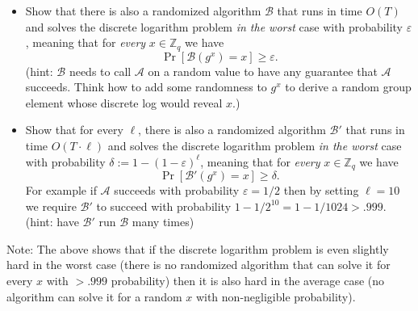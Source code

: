 \documentclass[11pt]{article}
\newcommand {\eps} {\varepsilon}
\newcommand {\A} {\mathcal{A}}
\newcommand{\B}{\mathcal{B}}
\newcommand {\ZZ} {\mathbb{Z}}
\begin{document}
\begin{itemize}
	\item Show that there is also a randomized algorithm $\B$ that runs in time $O(T)$ and solves the discrete logarithm problem  \emph{in the worst} case with probability $\eps$, meaning that for \emph{every} $x \in \ZZ_q$ we have
	$$ \Pr[\B(g^x) =x] \geq \eps.$$
   (hint: $\B$ needs to call $\A$ on a random value to have any guarantee that $\A$ succeeds. Think how to add some randomness to $g^x$ to derive a random group element whose discrete log would reveal $x$.) 
   
   \item  Show that for every $\ell$, there is also a randomized algorithm $\B'$ that runs in time $O(T \cdot \ell)$ and solves the discrete logarithm problem  \emph{in the worst} case with probability $\delta := 1 - (1-\eps)^\ell$, meaning that for \emph{every} $x \in \ZZ_q$ we have
   $$ \Pr[\B'(g^x) =x] \geq \delta.$$ For example if $\A$ succeeds with probability $\eps = 1/2$ then by setting $\ell=10$ we require $\B'$ to succeed with probability $1 - 1/2^{10} = 1 - 1/1024 > .999$. \\
   (hint: have $\B'$ run $\B$ many times)

\end{itemize}



Note: The above shows that if the discrete logarithm problem is even slightly hard in the worst case (there is no randomized algorithm that can solve it for every $x$ with $>.999$ probability) then it is also hard in the average case (no algorithm can solve it for a random $x$ with non-negligible probability). 
\end{document}
